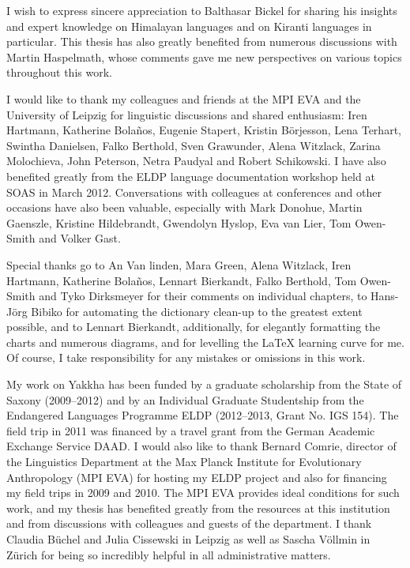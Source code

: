 I wish to express sincere appreciation to Balthasar Bickel for sharing his insights and expert knowledge on Himalayan languages and on Kiranti languages in particular. This thesis has also greatly  benefited from numerous discussions with Martin Haspelmath, whose comments gave me new perspectives on various topics throughout this work.

I would like to thank my colleagues and friends at the MPI EVA and the University of Leipzig for linguistic discussions and shared enthusiasm: Iren Hartmann, Katherine Bolaños, Eugenie Stapert, Kristin Börjesson, Lena Terhart, Swintha Da\-niel\-sen, Falko Berthold, Sven Grawunder, Alena Witzlack, Zarina Molochieva, John Peterson, Netra Paudyal and Robert Schikowski. I have also benefited greatly from the  ELDP language documentation workshop held at SOAS in March 2012. Conversations with colleagues at conferences and other occasions have also been valuable, especially with Mark Donohue, Martin Gaenszle, Kristine Hildebrandt, Gwendolyn Hyslop,  Eva van Lier,  Tom Owen-Smith and Volker Gast.


Special thanks go to An Van linden,  Mara Green, Alena Witzlack, Iren Hartmann, Katherine Bolaños, Lennart Bierkandt, Falko Berthold, Tom Owen-Smith and Tyko Dirksmeyer for their comments on individual chapters, to Hans-Jörg Bibiko for auto\-mating the dictionary clean-up to the greatest extent possible, and to Lennart Bierkandt, additionally,  for elegantly formatting the  charts  and numerous diagrams, and for levelling the  LaTeX learning curve for me. Of course, I take responsibility for any mistakes or omissions in this work.

My work on Yakkha has been  funded by a graduate scholarship from the State of Saxony (2009–2012) and by an Individual Graduate Studentship from the Endangered Languages Programme ELDP (2012–2013, Grant No. IGS 154). The field trip in 2011 was financed by a travel grant from the German Academic Exchange Service DAAD. I would also like to thank Bernard Comrie, director of the Linguistics Department at the Max Planck Institute for Evolutionary Anthropology (MPI EVA)  for hosting my ELDP project and also for financing my field trips in 2009 and 2010. The MPI EVA provides ideal conditions for such work, and my thesis has benefited greatly from the resources at this institution and from discussions with colleagues and guests of the department. I thank Claudia Büchel and Julia Cissewski in Leipzig as well as Sascha Völlmin in Zürich for being so incredibly helpful in all administrative matters.

